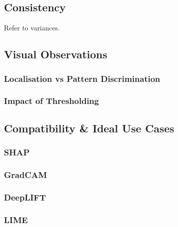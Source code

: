\documentclass[main]{subfiles}
\begin{document}
\subsection{Consistency}
Refer to variances.

\subsection{Visual Observations}

\subsubsection{Localisation vs Pattern Discrimination}

\subsubsection{Impact of Thresholding}



\subsection{Compatibility \& Ideal Use Cases}

\subsubsection{SHAP}
\subsubsection{GradCAM}
\subsubsection{DeepLIFT}
\subsubsection{LIME}
\end{document}
